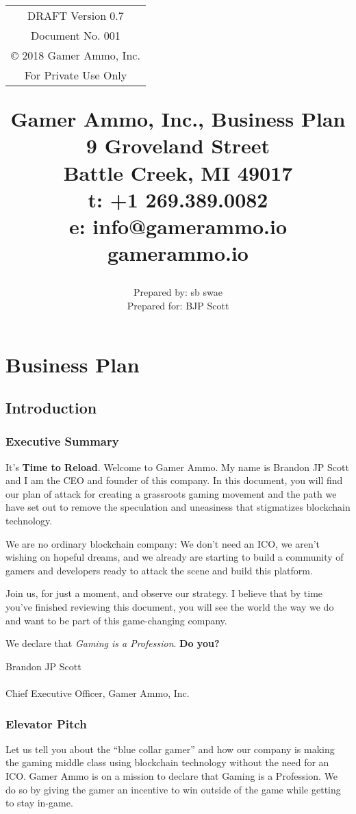 \documentclass[11pt]{report}
\author{Prepared by: sb swae\\Prepared for: BJP Scott}
\title{  \begin{center} 
        \vspace{2ex} 
        \begin{tabular}{|||c|||}
            \fontsize{3.5mm}{1.2em} 
            DRAFT Version 0.7 \\
            Document No. 001 \\
            \copyright\hspace{.25em} 2018 Gamer Ammo, Inc.\\
            For Private Use Only \\ 
        \end{tabular} 
    \end{center}
    \vspace{10ex} 
    \textbf{\huge{Gamer Ammo, Inc., Business Plan}}\\{\small9 Groveland Street\\Battle Creek, MI 49017\\t: +1 269.389.0082\\e: info@gamerammo.io\\gamerammo.io}}
\begin{document}
\maketitle
\part{Business Plan}
\tableofcontents
\listoftables
\newpage
\chapter{Introduction}
\section{Executive Summary}
\large{It's \textbf{Time to Reload}. Welcome to Gamer Ammo. My name is Brandon JP Scott and I am the CEO and founder of this company. In this document, you will find our plan of attack for creating a grassroots gaming movement and the path we have set out to remove the speculation and uneasiness that stigmatizes blockchain technology.

We are no ordinary blockchain company: We don't need an ICO, we aren't wishing on hopeful dreams, and we already are starting to build a community of gamers and developers ready to attack the scene and build this platform.

Join us, for just a moment, and observe our strategy. I believe that by time you've finished reviewing this document, you will see the world the way we do and want to be part of this game-changing company.

We declare that \textit{Gaming is a Profession}.
\newline\newline
\textbf{Do you?}}
\newline\newline
Brandon JP Scott\\\\Chief Executive Officer, Gamer Ammo, Inc.
\section{Elevator Pitch}
Let us tell you about the ``blue collar gamer'' and how our company is making the gaming middle class using blockchain technology without the need for an ICO. Gamer Ammo is on a mission to declare that Gaming is a Profession. We do so by giving the gamer an incentive to win outside of the game while getting to stay in-game.
\end{document}
